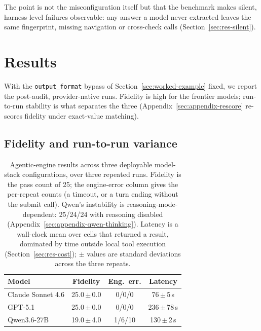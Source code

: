 \documentclass[11pt]{article}
\begin{document}
The point is not the misconfiguration itself but that the benchmark
makes silent, harness-level failures observable: any answer a model
never extracted leaves the same fingerprint, missing navigation or
cross-check calls (Section~\ref{sec:res-silent}).

\section{Results}
\label{sec:results}

With the \texttt{output\_format} bypass of
Section~\ref{sec:worked-example} fixed, we report the post-audit,
provider-native runs. Fidelity is high for the frontier models;
run-to-run stability is what separates the three
(Appendix~\ref{sec:appendix-rescore} re-scores fidelity under
exact-value matching).

\subsection{Fidelity and run-to-run variance}
\label{sec:res-fidelity}
\begin{table}[t]
\centering
\small
\setlength{\tabcolsep}{4pt}
\begin{tabular}{@{}lccc@{}}
\toprule
\textbf{Model} & \textbf{Fidelity} & \textbf{Eng.\ err.} & \textbf{Latency} \\
\midrule
Claude Sonnet 4.6 & 25.0\,$\pm$\,0.0 & 0/0/0 & 76\,$\pm$\,5\,s \\
GPT-5.1           & 25.0\,$\pm$\,0.0 & 0/0/0 & 236\,$\pm$\,78\,s \\
Qwen3.6-27B       & 19.0\,$\pm$\,4.0 & 1/6/10 & 130\,$\pm$\,2\,s \\
\bottomrule
\end{tabular}
\caption{Agentic-engine results across three deployable model-stack
configurations, over three repeated runs. Fidelity is the pass count of
25; the engine-error column gives the per-repeat counts (a timeout, or a
turn ending without the submit call). Qwen's instability is
reasoning-mode-dependent: 25/24/24 with reasoning disabled
(Appendix~\ref{sec:appendix-qwen-thinking}). Latency is a wall-clock mean over
cells that returned a result, dominated by time outside local tool
execution (Section~\ref{sec:res-cost}); $\pm$ values are standard deviations
across the three repeats.}
\label{tab:results}
\end{table}
\end{document}
